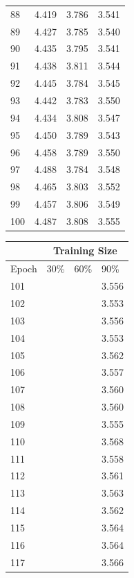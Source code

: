 \documentclass[12pt]{article}
\begin{document}
\begin{center}
\begin{tabular}{|l || l| l| l|}
            88 & 4.419 & 3.786 & 3.541 \\
            89 & 4.427 & 3.785 & 3.540 \\
            90 & 4.435 & 3.795 & 3.541 \\
            91 & 4.438 & 3.811 & 3.544 \\
            92 & 4.445 & 3.784 & 3.545 \\
            93 & 4.442 & 3.783 & 3.550 \\
            94 & 4.434 & 3.808 & 3.547 \\
            95 & 4.450 & 3.789 & 3.543 \\
            96 & 4.458 & 3.789 & 3.550 \\
            97 & 4.488 & 3.784 & 3.548 \\
            98 & 4.465 & 3.803 & 3.552 \\
            99 & 4.457 & 3.806 & 3.549 \\
            100 & 4.487 & 3.808 & 3.555 \\
            \hline
          \end{tabular}
          \begin{tabular}{|l || l| l| l|}
            \hline
            &\multicolumn{3}{|c|}{Training Size} \\
            \hline
            Epoch & 30\% & 60\% & 90\% \\
            \hline
            101 & & & 3.556 \\
            102 & & & 3.553 \\
            103 & & & 3.556 \\
            104 & & & 3.553 \\
            105 & & & 3.562 \\
            106 & & & 3.557 \\
            107 & & & 3.560 \\
            108 & & & 3.560 \\
            109 & & & 3.555 \\
            110 & & & 3.568 \\
            111 & & & 3.558 \\
            112 & & & 3.561 \\
            113 & & & 3.563 \\
            114 & & & 3.562 \\
            115 & & & 3.564 \\
            116 & & & 3.564 \\
            117 & & & 3.566 \\

\end{tabular}
\end{center}
\end{document}

